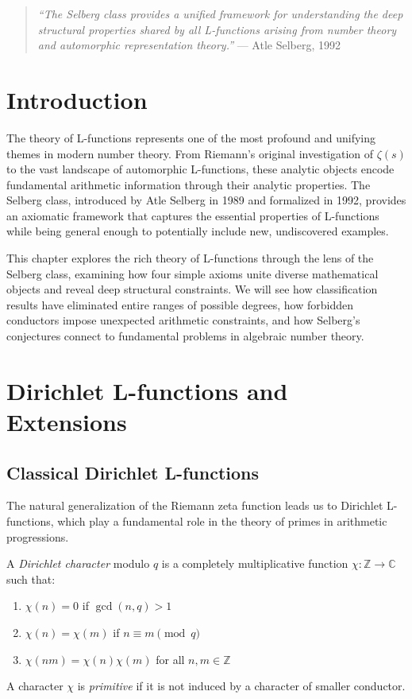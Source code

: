 
\begin{quote}
\textit{``The Selberg class provides a unified framework for understanding the deep structural properties shared by all L-functions arising from number theory and automorphic representation theory.''} --- Atle Selberg, 1992
\end{quote}

\section{Introduction}

The theory of L-functions represents one of the most profound and unifying themes in modern number theory. From Riemann's original investigation of $\zeta(s)$ to the vast landscape of automorphic L-functions, these analytic objects encode fundamental arithmetic information through their analytic properties. The Selberg class, introduced by Atle Selberg in 1989 and formalized in 1992, provides an axiomatic framework that captures the essential properties of L-functions while being general enough to potentially include new, undiscovered examples.

This chapter explores the rich theory of L-functions through the lens of the Selberg class, examining how four simple axioms unite diverse mathematical objects and reveal deep structural constraints. We will see how classification results have eliminated entire ranges of possible degrees, how forbidden conductors impose unexpected arithmetic constraints, and how Selberg's conjectures connect to fundamental problems in algebraic number theory.

\section{Dirichlet L-functions and Extensions}
\label{sec:dirichlet-l-functions}

\subsection{Classical Dirichlet L-functions}

The natural generalization of the Riemann zeta function leads us to Dirichlet L-functions, which play a fundamental role in the theory of primes in arithmetic progressions.

\begin{definition}
A \emph{Dirichlet character} modulo $q$ is a completely multiplicative function $\chi: \mathbb{Z} \to \mathbb{C}$ such that:
\begin{enumerate}
\item $\chi(n) = 0$ if $\gcd(n,q) > 1$
\item $\chi(n) = \chi(m)$ if $n \equiv m \pmod{q}$
\item $\chi(nm) = \chi(n)\chi(m)$ for all $n,m \in \mathbb{Z}$
\end{enumerate}
A character $\chi$ is \emph{primitive} if it is not induced by a character of smaller conductor.
\end{definition}

